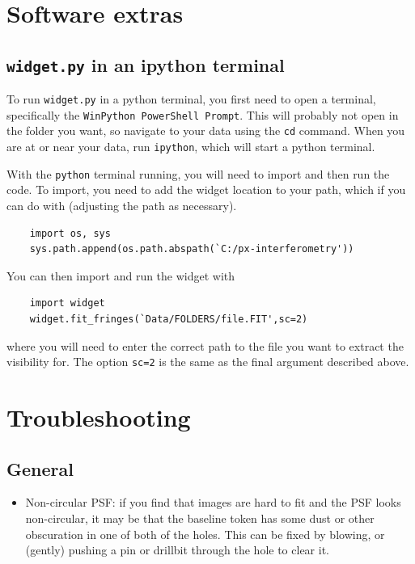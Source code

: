 \documentclass[11pt]{article}
\begin{document}
\clearpage

\section{Software extras}

\subsection{\texttt{widget.py} in an ipython terminal}\label{sec:widget_ipython}

To run \texttt{widget.py} in a python terminal, you first need to open a terminal, specifically the \texttt{WinPython PowerShell Prompt}. This will probably not open in the folder you want, so navigate to your data using the \texttt{cd} command. When you are at or near your data, run \texttt{ipython}, which will start a python terminal.

With the \texttt{python} terminal running, you will need to import and then run the code. To import, you need to add the widget location to your path, which if you can do with (adjusting the path as necessary).
\begin{verbatim}
    import os, sys
    sys.path.append(os.path.abspath(`C:/px-interferometry'))
\end{verbatim}
You can then import and run the widget with
\begin{verbatim}
    import widget
    widget.fit_fringes(`Data/FOLDERS/file.FIT',sc=2)
\end{verbatim}
where you will need to enter the correct path to the file you want to extract the visibility for. The option \texttt{sc=2} is the same as the final argument described above.

\clearpage

\section{Troubleshooting}

\subsection{General}

\begin{itemize}
    \item Non-circular PSF: if you find that images are hard to fit and the PSF looks non-circular, it may be that the baseline token has some dust or other obscuration in one of both of the holes. This can be fixed by blowing, or (gently) pushing a pin or drillbit through the hole to clear it.
\end{itemize}
\end{document}
